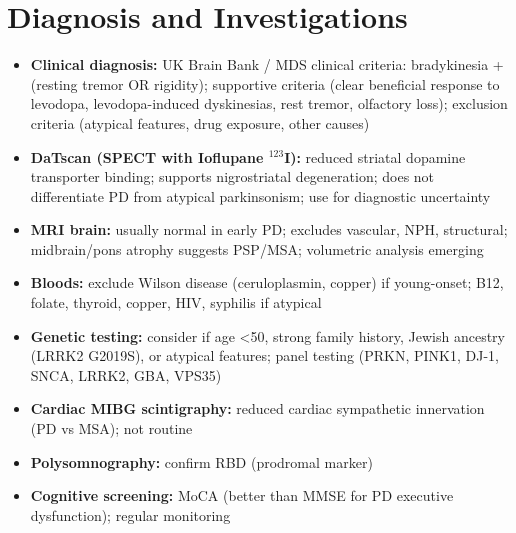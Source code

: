 \section*{Diagnosis and Investigations}
\begin{itemize}
    \item \textbf{Clinical diagnosis:} UK Brain Bank / MDS clinical criteria: bradykinesia + (resting tremor OR rigidity); supportive criteria (clear beneficial response to levodopa, levodopa-induced dyskinesias, rest tremor, olfactory loss); exclusion criteria (atypical features, drug exposure, other causes)
    \item \textbf{DaTscan (SPECT with Ioflupane $^{123}$I):} reduced striatal dopamine transporter binding; supports nigrostriatal degeneration; does not differentiate PD from atypical parkinsonism; use for diagnostic uncertainty
    \item \textbf{MRI brain:} usually normal in early PD; excludes vascular, NPH, structural; midbrain/pons atrophy suggests PSP/MSA; volumetric analysis emerging
    \item \textbf{Bloods:} exclude Wilson disease (ceruloplasmin, copper) if young-onset; B12, folate, thyroid, copper, HIV, syphilis if atypical
    \item \textbf{Genetic testing:} consider if age <50, strong family history, Jewish ancestry (LRRK2 G2019S), or atypical features; panel testing (PRKN, PINK1, DJ-1, SNCA, LRRK2, GBA, VPS35)
    \item \textbf{Cardiac MIBG scintigraphy:} reduced cardiac sympathetic innervation (PD vs MSA); not routine
    \item \textbf{Polysomnography:} confirm RBD (prodromal marker)
    \item \textbf{Cognitive screening:} MoCA (better than MMSE for PD executive dysfunction); regular monitoring
\end{itemize}

